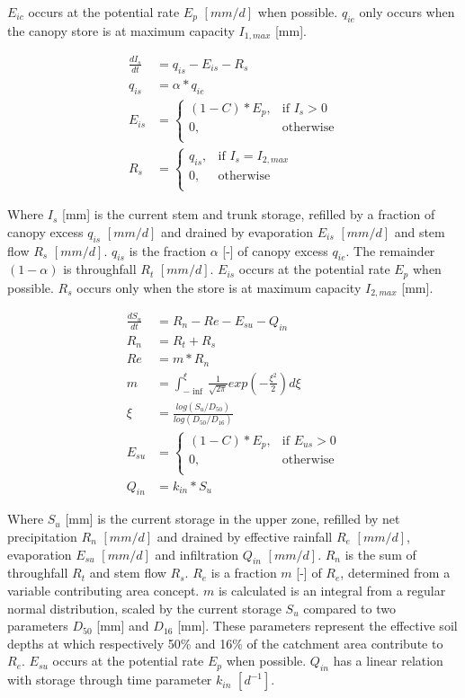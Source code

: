 \noindent$E_{ic}$ occurs at the potential rate $E_p$ $[mm/d]$ when possible.
$q_{ie}$ only occurs when the canopy store is at maximum capacity $I_{1,max}$ [mm].

\begin{align}
	\frac{dI_s}{dt} &= q_{is} - E_{is}  - R_s\\
	q_{is} &= \alpha*q_{ie} \\
	E_{is} &= \begin{cases}
		(1-C)*E_p, &\text{if } I_s > 0 \\
		0, &\text{otherwise} \\
	\end{cases} \\
	R_s &= \begin{cases}
		q_{is}, &\text{if } I_s = I_{2,max}\\
		0, &\text{otherwise}\\
	\end{cases}	
\end{align}

Where $I_s$ [mm] is the current stem and trunk storage, refilled by a fraction of canopy excess $q_{is}$ $[mm/d]$ and drained by evaporation $E_{is}$ $[mm/d]$ and stem flow $R_s$ $[mm/d]$.
$q_{is}$ is the fraction $\alpha$ [-] of canopy excess $q_{ie}$.
The remainder $(1-\alpha)$ is throughfall $R_t$ $[mm/d]$.
$E_{is}$ occurs at the potential rate $E_p$ when possible.
$R_s$ occurs only when the store is at maximum capacity $I_{2,max}$ [mm].

\begin{align}
	\frac{dS_u}{dt} &= R_n - Re - E_{su} - Q_{in} \\
	R_n &= R_t + R_s \\
	Re &= m*R_n \\
	m &= \int_{-\inf}^{\xi}\frac{1}{\sqrt{2\pi}}exp\left(-\frac{\xi^2}{2}\right)d\xi\\
	\xi &= \frac{log\left(S_u/D_{50}\right)}{log\left(D_{50}/D_{16}\right)}\\
	E_{su} &= \begin{cases}
		(1-C)*E_p, &\text{if } E_{us} > 0 \\
		0, &\text{otherwise} \\
	\end{cases} \\
	Q_{in} &= k_{in} *S_u
\end{align}

Where $S_u$ [mm] is the current storage in the upper zone, refilled by net precipitation $R_n$ $[mm/d]$ and drained by effective rainfall $R_e$ $[mm/d]$, evaporation $E_{su}$ $[mm/d]$ and infiltration $Q_{in}$ $[mm/d]$.
$R_n$ is the sum of throughfall $R_t$ and stem flow $R_s$.
$R_e$ is a fraction $m$ [-] of $R_e$, determined from a variable contributing area concept.
$m$ is calculated is an integral from a regular normal distribution, scaled by the current storage $S_u$ compared to two parameters $D_{50}$ [mm] and $D_{16}$ [mm].
These parameters represent the effective soil depths at which respectively 50\% and 16\% of the catchment area contribute to $R_e$.
$E_{su}$ occurs at the potential rate $E_p$ when possible.
$Q_{in}$ has a linear relation with storage through time parameter $k_{in}$ $[d^{-1}]$.

